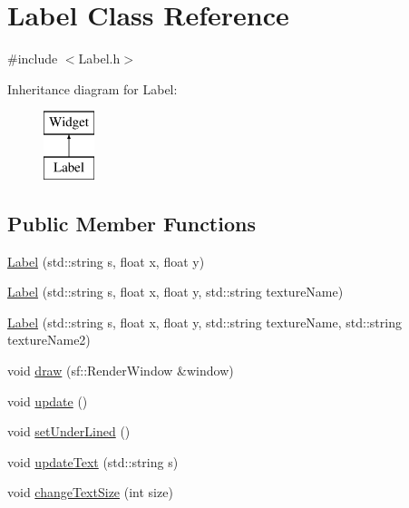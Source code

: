 \hypertarget{class_label}{}\section{Label Class Reference}
\label{class_label}


{\ttfamily \#include $<$Label.\+h$>$}

Inheritance diagram for Label\+:\begin{figure}[H]
\begin{center}
\leavevmode
\includegraphics[height=2.000000cm]{class_label}
\end{center}
\end{figure}
\subsection*{Public Member Functions}
\begin{DoxyCompactItemize}
\item 
\mbox{\hyperlink{class_label_aba14ad8fc32c6129f838ed2a80abe2f9}{Label}} (std\+::string s, float x, float y)
\item 
\mbox{\hyperlink{class_label_a3abc88d2408df444dc5f2d39ac2f19a2}{Label}} (std\+::string s, float x, float y, std\+::string texture\+Name)
\item 
\mbox{\hyperlink{class_label_a8d503e01b3ab97e9f5bd3cb972c7470e}{Label}} (std\+::string s, float x, float y, std\+::string texture\+Name, std\+::string texture\+Name2)
\item 
void \mbox{\hyperlink{class_label_acaf5dfeeab3e46b5795b8cd24c9d94fe}{draw}} (sf\+::\+Render\+Window \&window)
\item 
void \mbox{\hyperlink{class_label_a736aab0e4b280f1a3c86e1566b5eb235}{update}} ()
\item 
void \mbox{\hyperlink{class_label_ab653e984b25c9669866924d83cb2bed8}{set\+Under\+Lined}} ()
\item 
void \mbox{\hyperlink{class_label_a2a06e54df5c7e7aa3c7c7749fa80817c}{update\+Text}} (std\+::string s)
\item 
void \mbox{\hyperlink{class_label_aa3989f512cbeabf9864c090b1d7e0c9b}{change\+Text\+Size}} (int size)
\end{DoxyCompactItemize}
